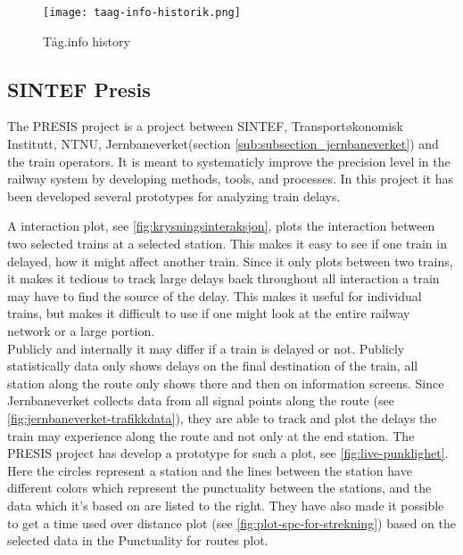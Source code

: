 \begin{figure}[!htbp]
	\texttt{[image: taag-info-historik.png]}
	\caption[Tåg.info history]{Tåg.info history
	\cite{taagInfo}}
	\label{fig:taag-info-historik}
\end{figure}
\pagebreak


\clearpage
\subsection{SINTEF Presis}
\label{sub:subsection_sintefPresis}

The PRESIS\cite{sintefPresis} project is a project between SINTEF\cite{sintef},
Transportøkonomisk Institutt\cite{transportOkonomiskInstitutt},
NTNU\cite{ntnu}, Jernbaneverket(section \vref{sub:subsection_jernbaneverket}) and the train operators. It is meant to
systematicly improve the precision level in the railway system by developing
methods, tools, and processes. In this project it has been developed several
prototypes for analyzing train delays. 

A interaction plot, see \vref{fig:krysningsinteraksjon}, plots the interaction
between two selected trains at a selected station. This makes it easy to see 
if one train in delayed, how it might affect another train. Since it only
plots between two trains, it makes it tedious to track large delays back 
throughout all interaction a train may have to find the source of the delay.
This makes it useful for individual trains, but makes it difficult to use if
one might look at the entire railway network or a large portion. \\

Publicly and internally it may differ if a train is delayed or not. Publicly
statistically data only shows delays on the final destination of the train, all
station along the route only shows there and then on information screens.
Since Jernbaneverket collects data from all signal points along the route (see \vref{fig:jernbaneverket-trafikkdata}), they
are able to track and plot the delays the train may experience along the route
and not only at the end station. The PRESIS project has develop a prototype for
such a plot, see \vref{fig:live-punklighet}. Here the circles represent a
station and the lines between the station have different 
colors which represent the punctuality between the stations, and the data which
it's based on are listed to the right. They have also made it possible to get a
time used over distance plot (see \vref{fig:plot-spc-for-strekning}) based on
the selected data in the Punctuality for routes plot. 

